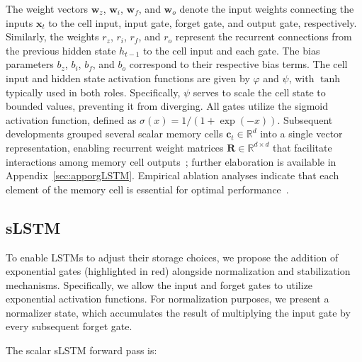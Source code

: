The weight vectors $\mathbf{w}_{z}$, $\mathbf{w}_{i}$,
$\mathbf{w}_{f}$, and $\mathbf{w}_{o}$ denote the input weights connecting the inputs $\mathbf{x}_t$ to the cell input, input gate, forget gate, and output gate, respectively. Similarly, the weights $r_{z}$, $r_{i}$, $r_{f}$, and $r_{o}$ represent the recurrent connections from the previous hidden state $h_{t-1}$ to the cell input and each gate. The bias parameters $b_{z}$, $b_{i}$, $b_{f}$, and $b_{o}$ correspond to their respective bias terms. The cell input and hidden state activation functions are given by $\varphi$ and $\psi$, with $\tanh$ typically used in both roles. Specifically, $\psi$ serves to scale the cell state to bounded values, preventing it from diverging. All gates utilize the sigmoid activation function, defined as $\sigma(x) = 1/(1+\exp(-x))$. Subsequent developments grouped several scalar memory cells $\mathbf{c}_t \in \mathbb{R}^{d}$ into a single vector representation, enabling recurrent weight matrices $\mathbf{R} \in \mathbb{R}^{d \times d}$ that facilitate interactions among memory cell outputs~\citep{Greff:15}; further elaboration is available in Appendix~\ref{sec:apporgLSTM}. Empirical ablation analyses indicate that each element of the memory cell is essential for optimal performance~\citep{Greff:15}.

\subsection{sLSTM}
\label{sec:sLSTM}

To enable LSTMs to adjust their storage choices, we propose the addition of exponential gates (highlighted in red) alongside normalization and stabilization mechanisms. Specifically, we allow the input and forget gates to utilize exponential activation functions. For normalization purposes, we present a normalizer state, which accumulates the result of multiplying the input gate by every subsequent forget gate.

The scalar sLSTM forward pass is:


